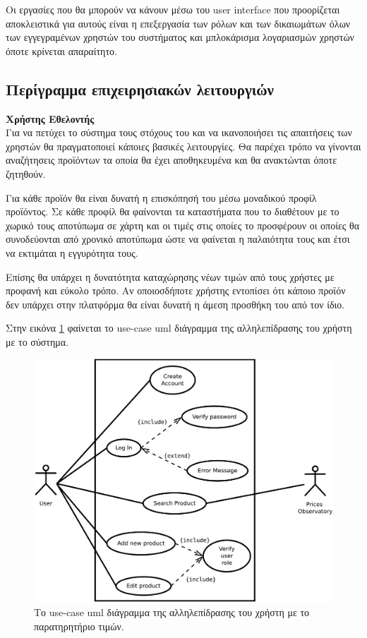 \documentclass[12pt, oneside, a4paper]{report}
\begin{document}
\hspace{0.6cm}Οι εργασίες που θα μπορούν να κάνουν μέσω του user interface που προορίζεται αποκλειστικά για αυτούς είναι η επεξεργασία των ρόλων και των δικαιωμάτων όλων των εγγεγραμένων χρηστών του συστήματος και μπλοκάρισμα λογαριασμών χρηστών όποτε κρίνεται απαραίτητο.



\subsection{Περίγραμμα επιχειρησιακών λειτουργιών}
\textbf{Χρήστης Εθελοντής}\\
\vspace{0.5cm}
\hspace{0.6cm}Για να πετύχει το σύστημα τους στόχους του και να ικανοποιήσει τις απαιτήσεις των χρηστών θα πραγματοποιεί κάποιες βασικές λειτουργίες. Θα παρέχει τρόπο να γίνονται αναζήτησεις προϊόντων τα οποία θα έχει αποθηκευμένα και θα ανακτώνται όποτε ζητηθούν. 

\hspace{0.6cm}Για κάθε προϊόν θα είναι δυνατή η επισκόπησή του μέσω μοναδικού προφίλ προϊόντος. Σε κάθε προφίλ θα φαίνονται τα καταστήματα που το διαθέτουν με το χωρικό τους αποτύπωμα σε χάρτη και οι τιμές στις οποίες το προσφέρουν οι οποίες θα συνοδεύονται από χρονικό αποτύπωμα ώστε να φαίνεται η παλαιότητα τους και έτσι να εκτιμάται η εγγυρότητα τους. 

\hspace{0.6cm}Επίσης θα υπάρχει η δυνατότητα καταχώρησης νέων τιμών από τους χρήστες με προφανή και εύκολο τρόπο. Αν οποιοσδήποτε χρήστης εντοπίσει ότι κάποιο προϊόν δεν υπάρχει στην πλατφόρμα θα είναι δυνατή η άμεση προσθήκη του από τον ίδιο.

\hspace{0.6cm}Στην εικόνα \ref{uml1} φαίνεται το use-case uml διάγραμμα της αλληλεπίδρασης του χρήστη με το σύστημα.

\begin{figure}[H]
   \centering
   \includegraphics[scale=0.4,keepaspectratio=true]{./user_use_cases.pdf}
   \caption{Το use-case uml διάγραμμα της αλληλεπίδρασης του χρήστη με το παρατηρητήριο τιμών.}
    \label{uml1}
\end{figure}
\end{document}
